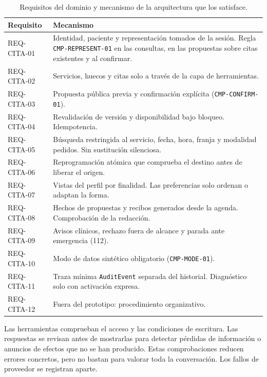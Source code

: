 \begin{table}[!htbp]
\centering
\caption{Requisitos del dominio y mecanismo de la arquitectura que los satisface.}
\label{tab:req-mecanismos}
\small
\begin{tabularx}{\textwidth}{L{0.15\textwidth}Y}
\toprule
\textbf{Requisito} & \textbf{Mecanismo} \\
\midrule
REQ-CITA-01 & Identidad, paciente y representación tomados de la sesión. Regla \texttt{CMP-REPRESENT-01} en las consultas, en las propuestas sobre citas existentes y al confirmar. \\
REQ-CITA-02 & Servicios, huecos y citas solo a través de la capa de herramientas. \\
REQ-CITA-03 & Propuesta pública previa y confirmación explícita (\texttt{CMP-CONFIRM-01}). \\
REQ-CITA-04 & Revalidación de versión y disponibilidad bajo bloqueo. Idempotencia. \\
REQ-CITA-05 & Búsqueda restringida al servicio, fecha, hora, franja y modalidad pedidos. Sin sustitución silenciosa. \\
REQ-CITA-06 & Reprogramación atómica que comprueba el destino antes de liberar el origen. \\
REQ-CITA-07 & Vistas del perfil por finalidad. Las preferencias solo ordenan o adaptan la forma. \\
REQ-CITA-08 & Hechos de propuestas y recibos generados desde la agenda. Comprobación de la redacción. \\
REQ-CITA-09 & Avisos clínicos, rechazo fuera de alcance y parada ante emergencia (112). \\
REQ-CITA-10 & Modo de datos sintético obligatorio (\texttt{CMP-MODE-01}). \\
REQ-CITA-11 & Traza mínima \texttt{AuditEvent} separada del historial. Diagnóstico solo con activación expresa. \\
REQ-CITA-12 & Fuera del prototipo: procedimiento organizativo. \\
\bottomrule
\end{tabularx}
\end{table}

Las herramientas comprueban el acceso y las condiciones de escritura. Las
respuestas se revisan antes de mostrarlas para detectar pérdidas de información
o anuncios de efectos que no se han producido. Estas comprobaciones reducen
errores concretos, pero no bastan para valorar toda la conversación. Los fallos
de proveedor se registran aparte.

